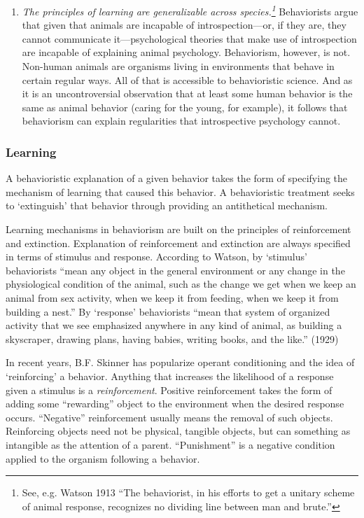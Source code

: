 \begin{refsection}
\begin{enumerate}
\item \emph{The principles of learning are generalizable across species.\footnote{See, e.g. Watson 1913 ``The behaviorist, in his efforts to get a unitary scheme of animal response, recognizes no dividing line between man and brute.''}} Behaviorists argue that given that animals are incapable of introspection---or, if they are, they cannot communicate it---psychological theories that make use of introspection are incapable of explaining animal psychology. Behaviorism, however, is not. Non-human animals are organisms living in environments that behave in certain regular ways. All of that is accessible to behavioristic science. And as it is an uncontroversial observation that at least some human behavior is the same as animal behavior (caring for the young, for example), it follows that behaviorism can explain regularities that introspective psychology cannot.

\end{enumerate}

\subsubsection{Learning}
\label{learning}

A behavioristic explanation of a given behavior takes the form of specifying the mechanism of learning that caused this behavior. A behavioristic treatment seeks to `extinguish' that behavior through providing an antithetical mechanism.

Learning mechanisms in behaviorism are built on the principles of reinforcement and extinction. Explanation of reinforcement and extinction are always specified in terms of stimulus and response. According to Watson, by `stimulus' behaviorists ``mean any object in the general environment or any change in the physiological condition of the animal, such as the change we get when we keep an animal from sex activity, when we keep it from feeding, when we keep it from building a nest.'' By `response' behaviorists ``mean that system of organized activity that we see emphasized anywhere in any kind of animal, as building a skyscraper, drawing plans, having babies, writing books, and the like.'' (1929)

In recent years, B.F. Skinner has popularize operant conditioning and the idea of `reinforcing' a behavior. Anything that increases the likelihood of a response given a stimulus is a \emph{reinforcement}. Positive reinforcement takes the form of adding some ``rewarding'' object to the environment when the desired response occurs. ``Negative'' reinforcement usually means the removal of such objects. Reinforcing objects need not be physical, tangible objects, but can something as intangible as the attention of a parent. ``Punishment'' is a negative condition applied to the organism following a behavior.


\end{refsection}
